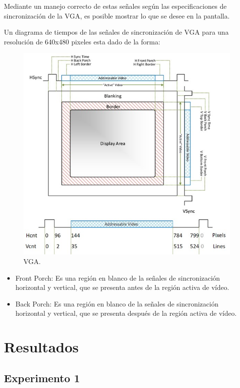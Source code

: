 \documentclass[journal,trans]{IEEEtran}
\begin{document}
	Mediante un manejo correcto de estas señales según las especificaciones de sincronización de la VGA, es posible mostrar lo que se desee en la pantalla. 
	
	Un diagrama de tiempos de las señales de sincronización de VGA para una resolución de 640x480 pixeles esta dado de la forma:
	
	\begin{figure}[hbtp]
		\centering
		\includegraphics[width = \columnwidth]{imagenes/vgapic.jpg}
		\caption[Figura1]{VGA.}
		\label{fig:VGA}
	\end{figure}


	\begin{itemize}
		\item Front Porch: Es una región en blanco de la señales de sincronización horizontal y vertical, que se presenta antes de la región activa de vídeo.
		\item Back Porch: Es una región en blanco de la señales de sincronización horizontal y vertical, que se presenta después de la región activa de vídeo.
	\end{itemize}
	
	\section{Resultados}
	
	
	\subsection{Experimento 1}
	
\end{document}
